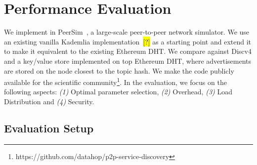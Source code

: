 
\section{Performance Evaluation}
\label{sec:eval}

We implement \sysname in PeerSim~\cite{p2p09-peersim}, a large-scale peer-to-peer network simulator. We use an existing vanilla Kademlia implementation~\hl{[?]} as a starting point and extend it to make it equivalent to the existing Ethereum DHT. We compare \sysname against Discv4 and a key/value store implemented on top Ethereum DHT, where advertisements are stored on the node closest to the topic hash. We make the code publicly available for the scientific community\footnote{https://github.com/datahop/p2p-service-discovery}. In the evaluation, we focus on the following aspects: \textit{(1)} Optimal parameter selection, \textit{(2)} Overhead, \textit{(3)} Load Distribution and \textit{(4)} Security. 

\subsection{Evaluation Setup}

